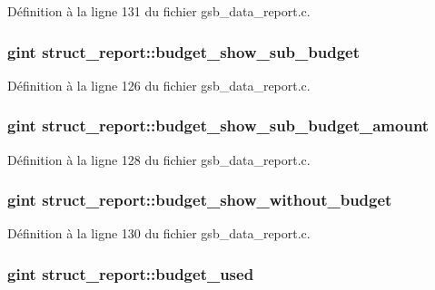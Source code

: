 Définition à la ligne 131 du fichier gsb\_\-data\_\-report.c.

\subsubsection[{budget\_\-show\_\-sub\_\-budget}]{\setlength{\rightskip}{0pt plus 5cm}gint {\bf struct\_\-report::budget\_\-show\_\-sub\_\-budget}}\label{structstruct__report_af15d83482479a78653e8a0ae66d19770}


Définition à la ligne 126 du fichier gsb\_\-data\_\-report.c.

\subsubsection[{budget\_\-show\_\-sub\_\-budget\_\-amount}]{\setlength{\rightskip}{0pt plus 5cm}gint {\bf struct\_\-report::budget\_\-show\_\-sub\_\-budget\_\-amount}}\label{structstruct__report_aef618bc474971e07d50fd01b17eaaa03}


Définition à la ligne 128 du fichier gsb\_\-data\_\-report.c.

\subsubsection[{budget\_\-show\_\-without\_\-budget}]{\setlength{\rightskip}{0pt plus 5cm}gint {\bf struct\_\-report::budget\_\-show\_\-without\_\-budget}}\label{structstruct__report_a1605c1caed58e4902698339263624bfe}


Définition à la ligne 130 du fichier gsb\_\-data\_\-report.c.

\subsubsection[{budget\_\-used}]{\setlength{\rightskip}{0pt plus 5cm}gint {\bf struct\_\-report::budget\_\-used}}\label{structstruct__report_aa14b85c9a79651bb8287dfb609a111ae}


